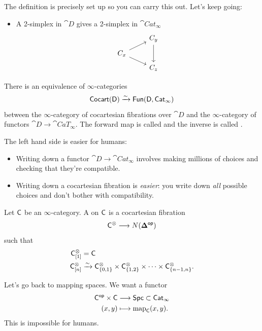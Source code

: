 The definition is precisely set up so you can carry this out. Let's keep going:
\begin{itemize}
	\item A 2-simplex in $\cat{D}$ gives a 2-simplex in $\cat{Cat}_\infty$
		\[
			\begin{tikzcd}[row sep=tiny]
				& C_y \ar[dd] \\
				C_x \ar[ur] \ar[dr] \\
				& C_z
			\end{tikzcd}
		\]
\end{itemize}
\begin{theorem}
	There is an equivalence of $\infty$-categories
	\[
		\mathsf{Cocart}(\mathsf{D}) \xrightarrow{\sim} \mathsf{Fun}(\mathsf{D},\mathsf{Cat}_\infty)
	\]
	between the $\infty$-category of cocartesian fibrations over $\cat{D}$ and the
	$\infty$-category of functors $\cat{D}\to \cat{CaT}_\infty$. The forward map is called
	 and the inverse is called .
\end{theorem}
The left hand side is easier for humans:
\begin{itemize}
	\item Writing down a functor $\cat{D}\to \cat{Cat}_\infty$ involves making millions of
		choices and checking that they're compatible.
	\item Writing down a cocartesian fibration is \emph{easier}: you write down \emph{all}
		possible choices and don't bother with compatibility.
\end{itemize}
\begin{definition}
	Let $\mathsf{C}$ be an $\infty$-category. A  on $\mathsf{C}$ is a cocartesian fibration
	\[
		\C^{\otimes} \to N(\bb{\Delta}\op)
	\]
	such that
	\begin{align*}
		\mathsf{C}_{[1]}^{\otimes} &= \mathsf{C} \\
		\mathsf{C}_{[n]}^{\otimes} &\xrightarrow{\sim} \mathsf{C}_{\{0,1\} }^{\otimes}\times \mathsf{C}_{\{1,2\} }^{\otimes}\times
		\dots\times \mathsf{C}_{\{n-1,n\} }^{\otimes}.
	\end{align*}
\end{definition}

Let's go back to mapping spaces. We want a functor
\begin{align*}
	\mathsf{C}^\mathsf{op}\times \mathsf{C} &\longrightarrow \mathsf{Spc} \subset \mathsf{Cat}_\infty \\
	(x,y) &\longmapsto \operatorname{map}_\mathsf{C}(x,y).
\end{align*}
This is impossible for humans.

